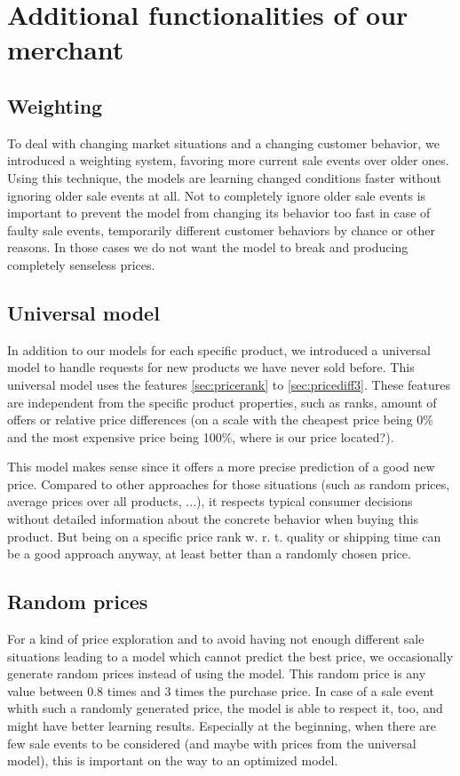 \section{Additional functionalities of our merchant}
\label{sec:add_func}
\subsection{Weighting}
	To deal with changing market situations and a changing customer behavior, we introduced a weighting system, favoring more current sale events over older ones. Using this technique, the models are learning changed conditions faster without ignoring older sale events at all. Not to completely ignore older sale events is important to prevent the model from changing its behavior too fast in case of faulty sale events, temporarily different customer behaviors by chance or other reasons. In those cases we do not want the model to break and producing completely senseless prices.

\subsection{Universal model}
	\label{sec:universal_model}
	In addition to our models for each specific product, we introduced a universal model to handle requests for new products we have never sold before. This universal model uses the features \ref{sec:pricerank} to \ref{sec:pricediff3}. These features are independent from the specific product properties, such as ranks, amount of offers or relative price differences (on a scale with the cheapest price being 0\% and the most expensive price being 100\%, where is our price located?).

	This model makes sense since it offers a more precise prediction of a good new price. Compared to other approaches for those situations (such as random prices, average prices over all products, ...), it respects typical consumer decisions without detailed information about the concrete behavior when buying this product. But being on a specific price rank w. r. t. quality or shipping time can be a good approach anyway, at least better than a randomly chosen price.

\subsection{Random prices}
	\label{sec:random_prices}
	For a kind of price exploration and to avoid having not enough different sale situations leading to a model which cannot predict the best price, we occasionally generate random prices instead of using the model. This random price is any value between 0.8 times and 3 times the purchase price. In case of a sale event whith such a randomly generated price, the model is able to respect it, too, and might have better learning results. Especially at the beginning, when there are few sale events to be considered (and maybe with prices from the universal model), this is important on the way to an optimized model.
